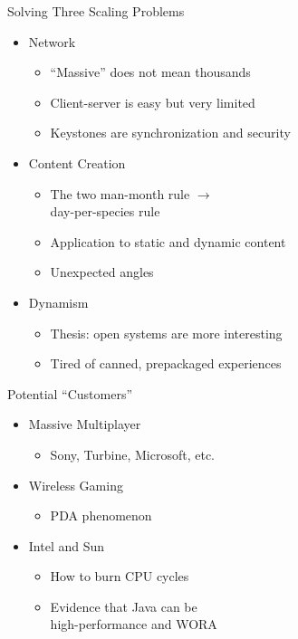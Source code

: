 \documentclass[%
final,
slideColor,
nototal,
nocolorBG,
pdf,
accumulate,
next,
]{prosper}
\begin{document}
\begin{slide}{Solving Three Scaling Problems}
  \begin{itemize}
  \item Network
    \begin{itemize}
    \item ``Massive'' does not mean thousands
    \item Client-server is easy but very limited
    \item Keystones are synchronization and security
    \end{itemize}
  \item Content Creation
    \begin{itemize}
    \item The two man-month rule $\longrightarrow$\\
      day-per-species rule
    \item Application to static and dynamic content
    \item Unexpected angles
    \end{itemize}
  \item Dynamism
    \begin{itemize}
    \item Thesis: open systems are more interesting
    \item Tired of canned, prepackaged experiences
    \end{itemize}
  \end{itemize}
\end{slide}

\begin{slide}{Potential ``Customers''}
  \begin{itemize}
  \item Massive Multiplayer
    \begin{itemize}
    \item Sony, Turbine, Microsoft, etc.
    \end{itemize}
  \item Wireless Gaming
    \begin{itemize}
    \item PDA phenomenon
    \end{itemize}
  \item Intel and Sun
    \begin{itemize}
    \item How to burn CPU cycles
    \item Evidence that Java can be\\high-performance and WORA
    \end{itemize}
  \end{itemize}
\end{slide}
\end{document}
